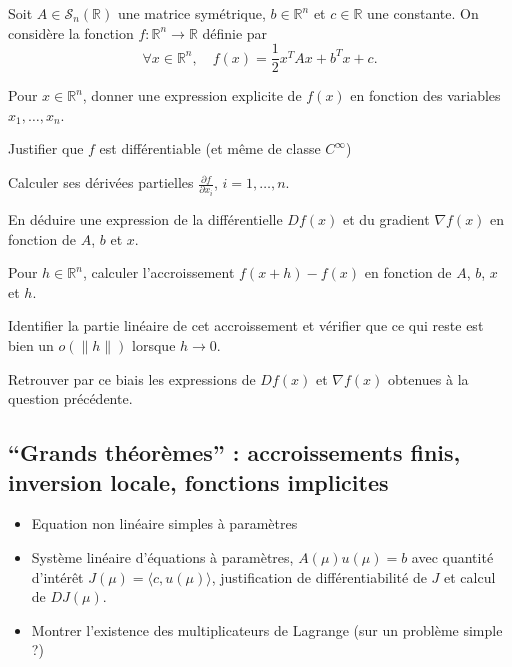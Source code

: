 \documentclass[11pt,a4paper]{article}
\begin{document}
\begin{exercice}
    Soit $A \in \mathcal S_n(\mathbb R)$ une matrice symétrique, $b \in \mathbb R^n$ et $c \in \mathbb R$ une constante. On considère la fonction $f : \mathbb R^n \rightarrow \mathbb R$ définie par 
    $$ 
        \forall x \in \mathbb R^n, \quad 
        f(x) = \frac{1}{2} x^T A x + b^T x + c. 
    $$
    \begin{questions}        
        \item \mbox{}
        \begin{questions}
            \item Pour $x \in \mathbb R^n$, donner une expression explicite de $f(x)$ en fonction des variables $x_1, \dots, x_n$.
            \item Justifier que $f$ est différentiable (et même de classe $C^\infty$) 
            \item Calculer ses dérivées partielles $\frac{\partial f}{\partial x_i}$, $i=1, \dots, n$.
            \item En déduire une expression de la différentielle $Df(x)$ et du gradient $\nabla f(x)$ en fonction de $A$, $b$ et $x$.
        \end{questions}

        \item \mbox{}
        \begin{questions}
            \item Pour $h \in \mathbb R^n$, calculer l'accroissement $f(x + h) - f(x)$ en fonction de $A$, $b$, $x$ et $h$.
            \item Identifier la partie linéaire de cet accroissement et vérifier que ce qui reste est bien un $o(\| h \|)$ lorsque $h \to 0$.
            \item Retrouver par ce biais les expressions de $Df(x)$ et $\nabla f(x)$ obtenues à la question précédente.
        \end{questions}
    \end{questions}
\end{exercice}


\subsection{``Grands théorèmes'' : accroissements finis, inversion locale, fonctions implicites}

{\color{Blue}
\begin{itemize}
    \item Equation non linéaire simples à paramètres
    \item Système linéaire d'équations à paramètres, $A(\mu) u(\mu) = b$ avec quantité d'intérêt $J(\mu) = \langle c, u(\mu)\rangle$, justification de différentiabilité de $J$ et calcul de $D J(\mu)$. 
    \item Montrer l'existence des multiplicateurs de Lagrange (sur un problème simple ?)
\end{itemize}

}
\end{document}
